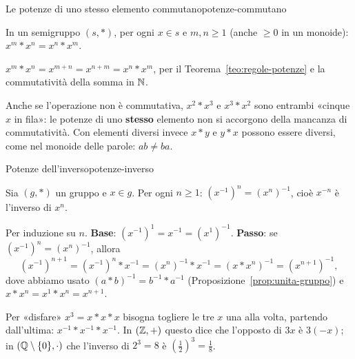 \begin{concetto}
\begin{Corollario}{Le potenze di uno stesso elemento commutano}{potenze-commutano}
    \begin{prerequisiti}
    \end{prerequisiti}
    In un semigruppo $(s, *)$, per ogni $x \in s$ e $m, n \geq 1$ (anche $\geq 0$ in un monoide): $x^m * x^n = x^n * x^m$.
\end{Corollario}
\begin{dimostrazione}
    $x^m * x^n = x^{m + n} = x^{n + m} = x^n * x^m$, per il Teorema~\ref{teo:regole-potenze} e la commutatività della somma in $\mathbb{N}$.
\end{dimostrazione}
\end{concetto}

\begin{spiegazione}
    Anche se l'operazione non è commutativa, $x^2 * x^3$ e $x^3 * x^2$ sono entrambi «cinque $x$ in fila»: le potenze di uno
    \textbf{stesso} elemento non si accorgono della mancanza di commutatività. Con elementi diversi invece $x * y$ e $y * x$ possono
    essere diversi, come nel monoide delle parole: $ab \neq ba$.
\end{spiegazione}

\begin{concetto}
\begin{Proposizione}{Potenze dell'inverso}{potenze-inverso}
    \begin{prerequisiti}
    \end{prerequisiti}
    Sia $(g, *)$ un gruppo e $x \in g$. Per ogni $n \geq 1$: $(x^{-1})^n = (x^n)^{-1}$, cioè $x^{-n}$ è l'inverso di $x^n$.
\end{Proposizione}
\begin{dimostrazione}
    Per induzione su $n$. \textbf{Base}: $(x^{-1})^1 = x^{-1} = (x^1)^{-1}$. \textbf{Passo}: se $(x^{-1})^n = (x^n)^{-1}$, allora
    \[ (x^{-1})^{n + 1} = (x^{-1})^n * x^{-1} = (x^n)^{-1} * x^{-1} = (x * x^n)^{-1} = (x^{n + 1})^{-1}, \]
    dove abbiamo usato $(a * b)^{-1} = b^{-1} * a^{-1}$ (Proposizione~\ref{prop:unita-gruppo}) e $x * x^n = x^1 * x^n = x^{n + 1}$.
\end{dimostrazione}
\end{concetto}

\begin{spiegazione}
    Per «disfare» $x^3 = x * x * x$ bisogna togliere le tre $x$ una alla volta, partendo dall'ultima: $x^{-1} * x^{-1} * x^{-1}$.
    In $(\mathbb{Z}, +)$ questo dice che l'opposto di $3x$ è $3(-x)$; in $(\mathbb{Q} \setminus \{0\}, \cdot)$ che l'inverso di $2^3 = 8$ è
    $(\frac{1}{2})^3 = \frac{1}{8}$.
\end{spiegazione}

